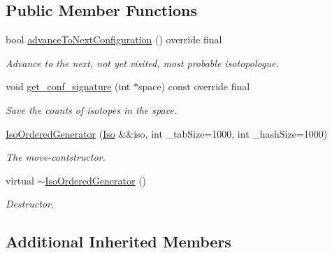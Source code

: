 \subsection*{Public Member Functions}
\begin{DoxyCompactItemize}
\item 
bool \mbox{\hyperlink{class_iso_spec_1_1_iso_ordered_generator_aa2438bb81fb1d68eda1637d67e9cb36d}{advance\+To\+Next\+Configuration}} () override final
\begin{DoxyCompactList}\small\item\em Advance to the next, not yet visited, most probable isotopologue. \end{DoxyCompactList}\item 
void \mbox{\hyperlink{class_iso_spec_1_1_iso_ordered_generator_af5d638985fd24c03bfe1f3d61e1b25c6}{get\+\_\+conf\+\_\+signature}} (int $\ast$space) const override final
\begin{DoxyCompactList}\small\item\em Save the counts of isotopes in the space. \end{DoxyCompactList}\item 
\mbox{\label{class_iso_spec_1_1_iso_ordered_generator_afaf81ff3a758cd59629db323560e263d}} 
\mbox{\hyperlink{class_iso_spec_1_1_iso_ordered_generator_afaf81ff3a758cd59629db323560e263d}{Iso\+Ordered\+Generator}} (\mbox{\hyperlink{class_iso_spec_1_1_iso}{Iso}} \&\&iso, int \+\_\+tab\+Size=1000, int \+\_\+hash\+Size=1000)
\begin{DoxyCompactList}\small\item\em The move-\/contstructor. \end{DoxyCompactList}\item 
\mbox{\label{class_iso_spec_1_1_iso_ordered_generator_a030c118b9a6131130684cd2710371842}} 
virtual \mbox{\hyperlink{class_iso_spec_1_1_iso_ordered_generator_a030c118b9a6131130684cd2710371842}{$\sim$\+Iso\+Ordered\+Generator}} ()
\begin{DoxyCompactList}\small\item\em Destructor. \end{DoxyCompactList}\end{DoxyCompactItemize}
\subsection*{Additional Inherited Members}


